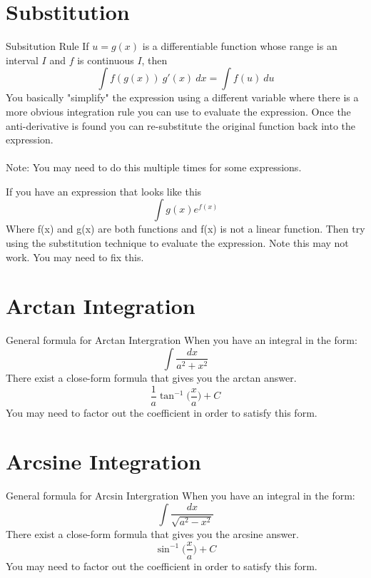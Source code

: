 \documentclass[letterpaper,10pt,twoside,twocolumn,openany]{book}
\begin{document}
\section{Substitution}
\begin{paperbox}{Subsitution Rule}
    If $u = g(x)$ is a differentiable function whose range is an interval $I$ and $f$ is continuous $I$, then
    \begin{equation}
        \int f(g(x))\ g'(x)\ dx = \int f(u)\ du
    \end{equation}
    You basically "simplify" the expression using a different variable where there is a more obvious integration rule you can use to evaluate the expression. Once the anti-derivative is found you can re-substitute the original function back into the expression.
    \\~\\
    Note: You may need to do this multiple times for some expressions.  
\end{paperbox}
\newpage
If you have an expression that looks like this 
$$
    \int g(x)e^{f(x)}
$$
Where f(x) and g(x) are both functions and f(x) is not a linear function. Then try using the substitution technique to evaluate the expression. Note this may not work. You may need to fix this.

\section{Arctan Integration}
\begin{paperbox}[]{General formula for Arctan Intergration}
    When you have an integral in the form:
    \begin{equation*}
        \int \frac{dx}{a^2 + x^2}
    \end{equation*}
    There exist a close-form formula that gives you the arctan answer.\\
    \begin{equation}
        \frac{1}{a} \tan^{-1}  \Big(\frac{x}{a}\Big) + C
    \end{equation}
    You may need to factor out the coefficient in order to satisfy this form.
\end{paperbox}




\section{Arcsine Integration}
\begin{paperbox}[]{General formula for Arcsin Intergration}
    When you have an integral in the form:
    \begin{equation*}
        \int \frac{dx}{\sqrt{a^2 - x^2}}
    \end{equation*}
    There exist a close-form formula that gives you the arcsine answer.\\
    \begin{equation}
        \sin^{-1}  \Big(\frac{x}{a}\Big) + C
    \end{equation}
    You may need to factor out the coefficient in order to satisfy this form.
\end{paperbox}
    
\end{document}
